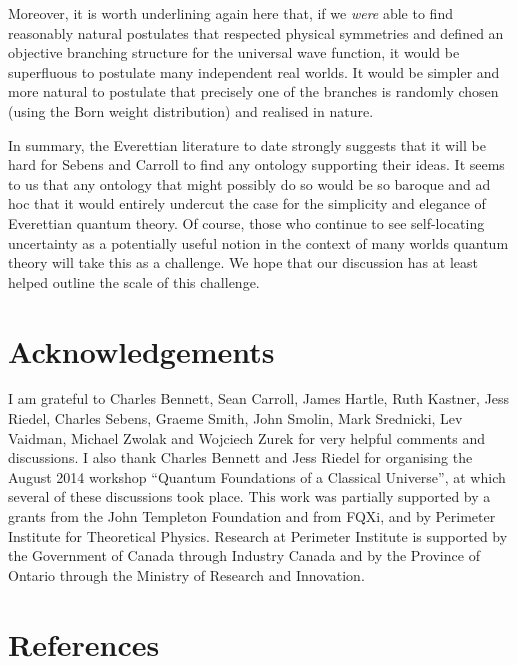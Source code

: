 \documentclass[aps,prl,12pt]{revtex4}
\begin{document}
Moreover, it is worth underlining again here that, if we {\it were}
able to find reasonably natural postulates that respected physical
symmetries and defined
an objective branching structure for the universal wave
function, it would be superfluous to postulate many 
independent real worlds.  It would be simpler and more natural
to postulate that precisely one of the branches is randomly
chosen (using the Born weight distribution) and realised in
nature.    

In summary, the Everettian literature to date
strongly suggests that it will be hard for Sebens and Carroll
to find any ontology supporting their ideas.
It seems to us that any
ontology that might possibly do so would be so baroque and ad hoc
that it would entirely undercut the case for the simplicity and
elegance of Everettian quantum theory. 
Of course, those who continue to see self-locating uncertainty 
as a potentially useful notion in the 
context of many worlds quantum theory will
take this as a challenge.   We hope that our discussion
has at least helped outline the scale of this challenge. 

\section{Acknowledgements}
I am grateful to Charles Bennett,
Sean Carroll, James Hartle, Ruth Kastner, Jess Riedel, 
Charles Sebens, Graeme Smith, John Smolin, Mark Srednicki,
Lev Vaidman, Michael Zwolak
and Wojciech Zurek for very helpful comments and discussions. 
I also thank Charles Bennett and Jess Riedel for
organising the August 2014 workshop ``Quantum Foundations of a Classical
Universe'', at which several of these discussions took place.  
This work was partially supported by a 
grants from the John Templeton Foundation and from FQXi, 
and by Perimeter Institute
for Theoretical Physics. Research at Perimeter Institute is supported
by the Government of Canada through Industry Canada and by the
Province of Ontario through the Ministry of Research and Innovation.

\section*{References}


{}
\end{document}
